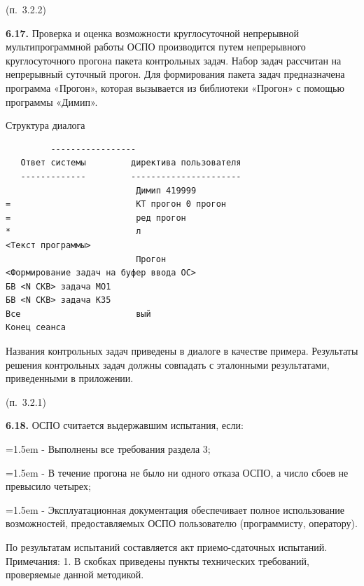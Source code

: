 \documentclass[11pt,a4paper]{article}
\begin{document}
\begin{center}(п.~3.2.2)\end{center}
\par\textbf{6.17.} Проверка и оценка возможности круглосуточной непрерывной мультипрограммной работы ОСПО производится путем непрерывного круглосуточного прогона пакета контрольных задач. Набор задач рассчитан на непрерывный суточный прогон. Для формирования пакета задач предназначена программа «Прогон», которая вызывается из библиотеки «Прогон» с помощью программы «Димип».\par
\begin{center}Структура диалога\end{center}
\begin{center}\small
\begin{BVerbatim}
         -----------------
   Ответ системы         директива пользователя
   -------------         ----------------------
                          Димип 419999
=                         КТ прогон 0 прогон
=                         ред прогон
*                         л
<Текст программы>
                          Прогон
<Формирование задач на буфер ввода ОС>
БВ <N СКВ> задача МО1
БВ <N СКВ> задача КЗ5
Все                       вый
Конец сеанса
\end{BVerbatim}
\end{center}

Названия контрольных задач приведены в диалоге в качестве примера. Результаты решения контрольных задач должны совпадать с эталонными результатами, приведенными в приложении.

\begin{center}(п.~3.2.1)\end{center}
\par\textbf{6.18.} ОСПО считается выдержавшим испытания, если:\par
\par\hangindent=1.5em - Выполнены все требования раздела 3;\par
\par\hangindent=1.5em - В течение прогона не было ни одного отказа ОСПО, а число сбоев не превысило четырех;\par
\par\hangindent=1.5em - Эксплуатационная документация обеспечивает полное использование возможностей, предоставляемых ОСПО пользователю (программисту, оператору).\par
По результатам испытаний составляется акт приемо-сдаточных испытаний. Примечания: 1. В скобках приведены пункты технических требований, проверяемые данной методикой.
\end{document}
